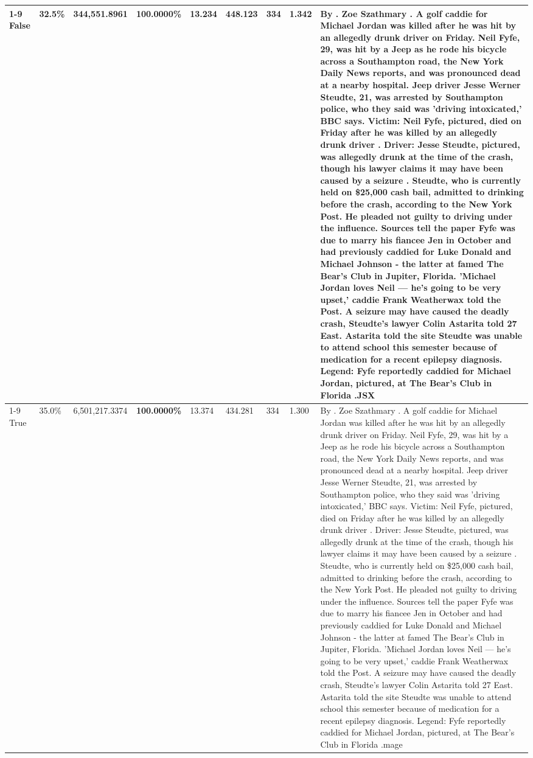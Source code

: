 \begin{table}[H]
\begin{tabular}{lllrlllll}
\cline{1-9}
False & 32.5\% & 344,551.8961 & \bfseries \color{red} 100.0000\% & 13.234 & 448.123 & 334 & 1.342 & By . Zoe Szathmary . A golf caddie for Michael Jordan was killed after he was hit by an allegedly drunk driver on Friday. Neil Fyfe, 29, was hit by a Jeep as he rode his bicycle across a Southampton road, the New York Daily News reports, and was pronounced dead at a nearby hospital. Jeep driver Jesse Werner Steudte, 21, was arrested by Southampton police, who they said was 'driving intoxicated,' BBC says. Victim: Neil Fyfe, pictured, died on Friday after he was killed by an allegedly drunk driver . Driver: Jesse Steudte, pictured, was allegedly drunk at the time of the crash, though his lawyer claims it may have been caused by a seizure . Steudte, who is currently held on \$25,000 cash bail, admitted to drinking before the crash, according to the New York Post. He pleaded not guilty to driving under the influence. Sources tell the paper Fyfe was due to marry his fiancee Jen in October and had previously caddied for Luke Donald and Michael Johnson - the latter at famed The Bear's Club in Jupiter, Florida. 'Michael Jordan loves Neil — he’s going to be very upset,' caddie Frank Weatherwax told the Post. A seizure may have caused the deadly crash, Steudte's lawyer Colin Astarita told 27 East. Astarita told the site Steudte was unable to attend school this semester because of medication for a recent epilepsy diagnosis. Legend: Fyfe reportedly caddied for Michael Jordan, pictured, at The Bear's Club in Florida .JSX \\
\cline{1-9}
True & 35.0\% & 6,501,217.3374 & \bfseries \color{red} 100.0000\% & 13.374 & 434.281 & 334 & 1.300 & By . Zoe Szathmary . A golf caddie for Michael Jordan was killed after he was hit by an allegedly drunk driver on Friday. Neil Fyfe, 29, was hit by a Jeep as he rode his bicycle across a Southampton road, the New York Daily News reports, and was pronounced dead at a nearby hospital. Jeep driver Jesse Werner Steudte, 21, was arrested by Southampton police, who they said was 'driving intoxicated,' BBC says. Victim: Neil Fyfe, pictured, died on Friday after he was killed by an allegedly drunk driver . Driver: Jesse Steudte, pictured, was allegedly drunk at the time of the crash, though his lawyer claims it may have been caused by a seizure . Steudte, who is currently held on \$25,000 cash bail, admitted to drinking before the crash, according to the New York Post. He pleaded not guilty to driving under the influence. Sources tell the paper Fyfe was due to marry his fiancee Jen in October and had previously caddied for Luke Donald and Michael Johnson - the latter at famed The Bear's Club in Jupiter, Florida. 'Michael Jordan loves Neil — he’s going to be very upset,' caddie Frank Weatherwax told the Post. A seizure may have caused the deadly crash, Steudte's lawyer Colin Astarita told 27 East. Astarita told the site Steudte was unable to attend school this semester because of medication for a recent epilepsy diagnosis. Legend: Fyfe reportedly caddied for Michael Jordan, pictured, at The Bear's Club in Florida .mage \\

\end{tabular}
\end{table}
